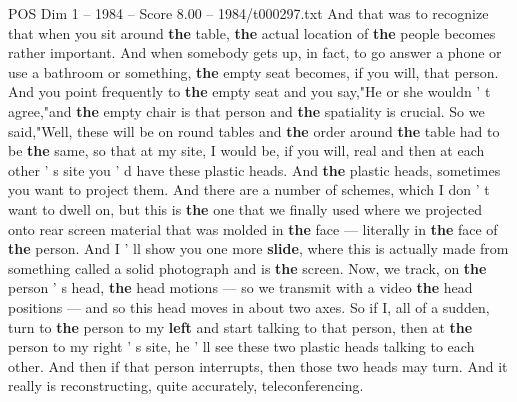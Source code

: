 \begin{textsample}{POS Dim 1 – 1984 – Score 8.00 – 1984/t000297.txt}
And that was to recognize that when you sit around \textbf{the} table, \textbf{the} actual location of \textbf{the} people becomes rather important.
And when somebody gets up, in fact, to go answer a phone or use a bathroom or something, \textbf{the} empty seat becomes, if you will, that person.
And you point frequently to \textbf{the} empty seat and you say,"He or she wouldn ' t agree,"and \textbf{the} empty chair is that person and \textbf{the} spatiality is crucial.
So we said,"Well, these will be on round tables and \textbf{the} order around \textbf{the} table had to be \textbf{the} same, so that at my site, I would be, if you will, real and then at each other ' s site you ' d have these plastic heads.
And \textbf{the} plastic heads, sometimes you want to project them.
And there are a number of schemes, which I don ' t want to dwell on, but this is \textbf{the} one that we finally used where we projected onto rear screen material that was molded in \textbf{the} face — literally in \textbf{the} face of \textbf{the} person.
And I ' ll show you one more \textbf{slide}, where this is actually made from something called a solid photograph and is \textbf{the} screen.
Now, we track, on \textbf{the} person ' s head, \textbf{the} head motions — so we transmit with a video \textbf{the} head positions — and so this head moves in about two axes.
So if I, all of a sudden, turn to \textbf{the} person to my \textbf{left} and start talking to that person, then at \textbf{the} person to my right ' s site, he ' ll see these two plastic heads talking to each other.
And then if that person interrupts, then those two heads may turn.
And it really is reconstructing, quite accurately, teleconferencing.

\end{textsample}

